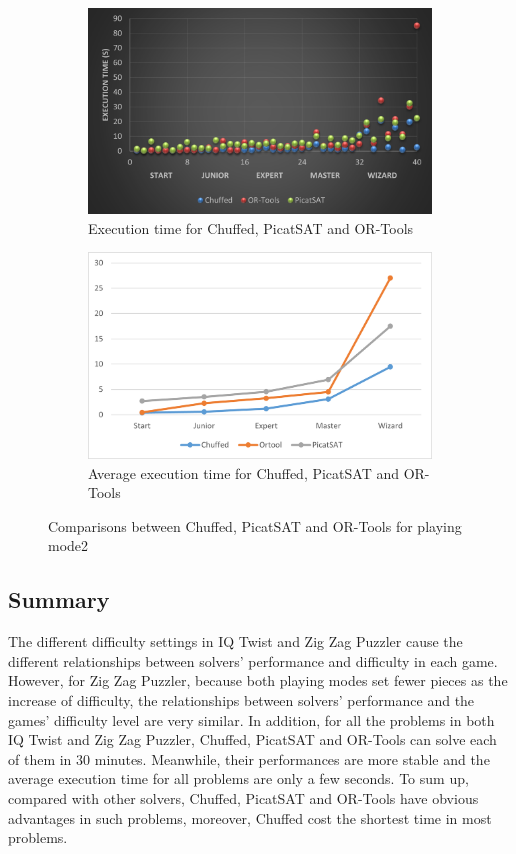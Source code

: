 \begin{figure}[H]
\begin{subfigure}[b]{0.48\textwidth}
  \centering
    \includegraphics[width=\textwidth]{figs/time2three.png}
    \caption{Execution time for Chuffed, PicatSAT and OR-Tools}
    \label{fig:compare}
\end{subfigure}
\begin{subfigure}[b]{0.48\textwidth}
 \centering
    \includegraphics[width=\textwidth]{figs/Threecomparison2.png}
    \caption{Average execution time for Chuffed, PicatSAT and OR-Tools}
    \label{fig:compare}
\end{subfigure}
\caption{Comparisons between Chuffed, PicatSAT and OR-Tools for playing mode2}
\label{fig:comparisonlast}
\end{figure}
\subsection{Summary}
\label{sec:Summary}
The different difficulty settings in IQ Twist and Zig Zag Puzzler cause the different relationships between solvers' performance and difficulty in each game. However, for Zig Zag Puzzler, because both playing modes set fewer pieces as the increase of difficulty, the relationships between solvers' performance and the games' difficulty level are very similar. In addition, for all the problems in both IQ Twist and Zig Zag Puzzler, Chuffed, PicatSAT and OR-Tools can solve each of them in 30 minutes. Meanwhile, their performances are more stable and the average execution time for all problems are only a few seconds. To sum up, compared with other solvers, Chuffed, PicatSAT and OR-Tools have obvious advantages in such problems, moreover, Chuffed cost the shortest time in most problems. 
 